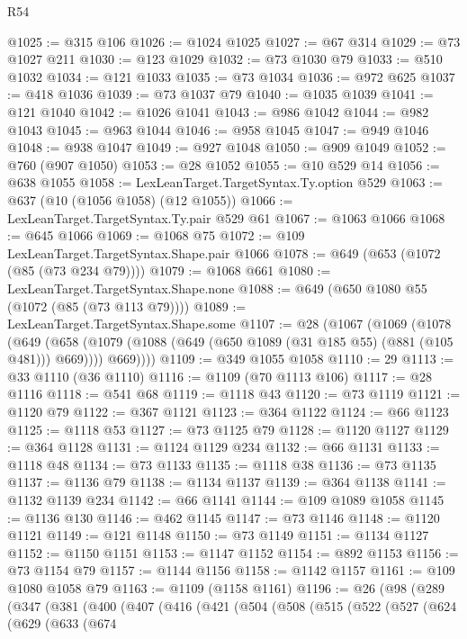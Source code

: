 \begin{lexlean}{R54}
\begin{coremodule}
@1025 := @315 @106
@1026 := @1024 @1025
@1027 := @67 @314
@1029 := @73 @1027 @211
@1030 := @123 @1029
@1032 := @73 @1030 @79
@1033 := @510 @1032
@1034 := @121 @1033
@1035 := @73 @1034
@1036 := @972 @625
@1037 := @418 @1036
@1039 := @73 @1037 @79
@1040 := @1035 @1039
@1041 := @121 @1040
@1042 := @1026 @1041
@1043 := @986 @1042
@1044 := @982 @1043
@1045 := @963 @1044
@1046 := @958 @1045
@1047 := @949 @1046
@1048 := @938 @1047
@1049 := @927 @1048
@1050 := @909 @1049
@1052 := @760 (@907 @1050)
@1053 := @28 @1052
@1055 := @10 @529 @14
@1056 := @638 @1055
@1058 := LexLeanTarget.TargetSyntax.Ty.option @529
@1063 := @637 (@10 (@1056 @1058) (@12 @1055))
@1066 := LexLeanTarget.TargetSyntax.Ty.pair @529 @61
@1067 := @1063 @1066
@1068 := @645 @1066
@1069 := @1068 @75
@1072 := @109 LexLeanTarget.TargetSyntax.Shape.pair @1066
@1078 := @649 (@653 (@1072 (@85 (@73 @234 @79))))
@1079 := @1068 @661
@1080 := LexLeanTarget.TargetSyntax.Shape.none
@1088 := @649 (@650 @1080 @55 (@1072 (@85 (@73 @113 @79))))
@1089 := LexLeanTarget.TargetSyntax.Shape.some
@1107 := @28
    (@1067
      (@1069
        (@1078
          (@649
            (@658 (@1079 (@1088 (@649 (@650 @1089 (@31 @185 @55) (@881 (@105 @481))) @669))))
            @669))))
@1109 := @349 @1055 @1058
@1110 := 29
@1113 := @33 @1110 (@36 @1110)
@1116 := @1109 (@70 @1113 @106)
@1117 := @28 @1116
@1118 := @541 @68
@1119 := @1118 @43
@1120 := @73 @1119
@1121 := @1120 @79
@1122 := @367 @1121
@1123 := @364 @1122
@1124 := @66 @1123
@1125 := @1118 @53
@1127 := @73 @1125 @79
@1128 := @1120 @1127
@1129 := @364 @1128
@1131 := @1124 @1129 @234
@1132 := @66 @1131
@1133 := @1118 @48
@1134 := @73 @1133
@1135 := @1118 @38
@1136 := @73 @1135
@1137 := @1136 @79
@1138 := @1134 @1137
@1139 := @364 @1138
@1141 := @1132 @1139 @234
@1142 := @66 @1141
@1144 := @109 @1089 @1058
@1145 := @1136 @130
@1146 := @462 @1145
@1147 := @73 @1146
@1148 := @1120 @1121
@1149 := @121 @1148
@1150 := @73 @1149
@1151 := @1134 @1127
@1152 := @1150 @1151
@1153 := @1147 @1152
@1154 := @892 @1153
@1156 := @73 @1154 @79
@1157 := @1144 @1156
@1158 := @1142 @1157
@1161 := @109 @1080 @1058 @79
@1163 := @1109 (@1158 @1161)
@1196 := @26
    (@98
      (@289
        (@347
          (@381
            (@400
              (@407
                (@416
                  (@421
                    (@504
                      (@508
                        (@515
                          (@522
                            (@527
                              (@624
                                (@629
                                  (@633
                                    (@674

\end{coremodule}
\end{lexlean}
